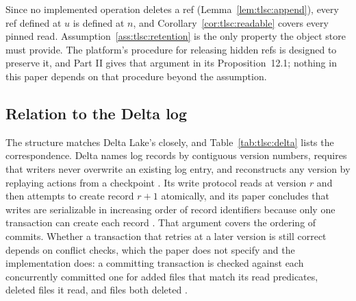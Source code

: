 \documentclass[11pt,letterpaper]{article}
\theoremstyle{definition}
\theoremstyle{remark}
\begin{document}
Since no implemented operation deletes a ref (Lemma~\ref{lem:tlsc:append}), every ref defined at $u$ is defined at $n$, and Corollary~\ref{cor:tlsc:readable} covers every pinned read. Assumption~\ref{ass:tlsc:retention} is the only property the object store must provide. The platform's procedure for releasing hidden refs is designed to preserve it, and Part II gives that argument in its Proposition~12.1; nothing in this paper depends on that procedure beyond the assumption.

\subsection{Relation to the Delta log}
\label{sec:tlsc:delta}

The structure matches Delta Lake's closely, and Table~\ref{tab:tlsc:delta} lists the correspondence. Delta names log records by contiguous version numbers, requires that writers never overwrite an existing log entry, and reconstructs any version by replaying actions from a checkpoint \cite{deltaprotocol,armbrust2020delta}. Its write protocol reads at version $r$ and then attempts to create record $r+1$ atomically, and its paper concludes that writes are serializable in increasing order of record identifiers because only one transaction can create each record \cite{armbrust2020delta}. That argument covers the ordering of commits. Whether a transaction that retries at a later version is still correct depends on conflict checks, which the paper does not specify and the implementation does: a committing transaction is checked against each concurrently committed one for added files that match its read predicates, deleted files it read, and files both deleted \cite{deltaconflictsrc,deltadocscc}.
\end{document}
